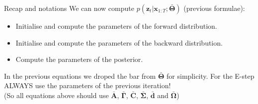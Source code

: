 \documentclass{beamer}
\newcommand{\bs}[1]{\boldsymbol{#1}}
\begin{document}
\begin{frame}{Recap and notations}
  We can now compute $p(\bs{z}_t|\bs{x}_{1:T};\bar{\bs{\Theta}})$ (previous formulae):
  \begin{itemize}
   \item Initialise and compute the parameters of the forward distribution.
   \item Initialise and compute the parameters of the backward distribution.
   \item Compute the parameters of the posterior.
  \end{itemize}\vspace{3mm}
  
  In the previous equations we droped the bar from $\bar{\bs{\Theta}}$ for simplicity. For the E-step ALWAYS use the parameters of the previous iteration!\\
  (So all equations above should use $\bar{\bs{A}}$, $\bar{\bs{\Gamma}}$, $\bar{\bs{C}}$, $\bar{\bs{\Sigma}}$, $\bar{\bs{d}}$ and $\bar{\bs{\Omega}}$)\vspace{3mm}


\end{frame}
\end{document}
